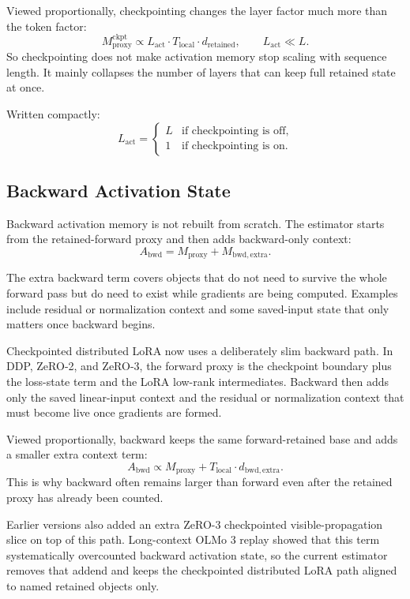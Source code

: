 Viewed proportionally, checkpointing changes the layer factor much more than
the token factor:
\[
M_{\mathrm{proxy}}^{\mathrm{ckpt}}
\propto
L_{\mathrm{act}} \cdot T_{\mathrm{local}} \cdot d_{\mathrm{retained}},
\qquad
L_{\mathrm{act}} \ll L.
\]
So checkpointing does not make activation memory stop scaling with sequence
length. It mainly collapses the number of layers that can keep full retained
state at once.

Written compactly:
\[
L_{\mathrm{act}} =
\begin{cases}
L & \text{if checkpointing is off}, \\
1 & \text{if checkpointing is on}.
\end{cases}
\]

\subsection{Backward Activation State}
Backward activation memory is not rebuilt from scratch. The estimator starts
from the retained-forward proxy and then adds backward-only context:
\[
A_{\mathrm{bwd}} = M_{\mathrm{proxy}} + M_{\mathrm{bwd,extra}}.
\]

The extra backward term covers objects that do not need to survive the whole
forward pass but do need to exist while gradients are being computed. Examples
include residual or normalization context and some saved-input state that only
matters once backward begins.

Checkpointed distributed LoRA now uses a deliberately slim backward path. In
DDP, ZeRO-2, and ZeRO-3, the forward proxy is the checkpoint boundary plus the
loss-state term and the LoRA low-rank intermediates. Backward then adds only
the saved linear-input context and the residual or normalization context that
must become live once gradients are formed.

Viewed proportionally, backward keeps the same forward-retained base and adds a
smaller extra context term:
\[
A_{\mathrm{bwd}}
\propto
M_{\mathrm{proxy}}
+ T_{\mathrm{local}} \cdot d_{\mathrm{bwd,extra}}.
\]
This is why backward often remains larger than forward even after the retained
proxy has already been counted.

Earlier versions also added an extra ZeRO-3 checkpointed visible-propagation
slice on top of this path. Long-context OLMo 3 replay showed that this term
systematically overcounted backward activation state, so the current estimator
removes that addend and keeps the checkpointed distributed LoRA path aligned to
named retained objects only.

